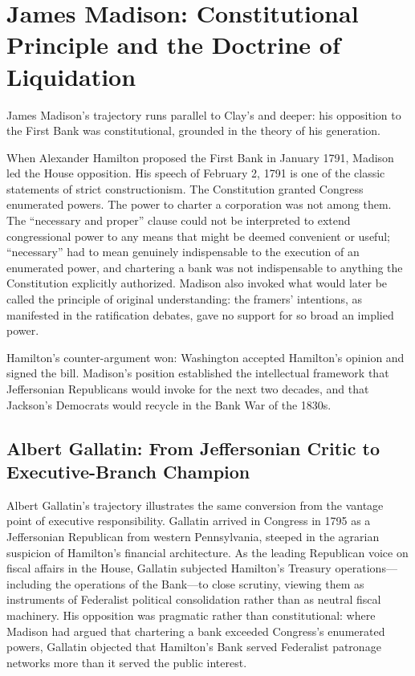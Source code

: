 \documentclass[12pt]{article}
\begin{document}
\section{James Madison: Constitutional Principle and the Doctrine of
         Liquidation}

James Madison's trajectory runs parallel to Clay's and deeper: his
opposition to the First Bank was constitutional, grounded in the theory
of his generation.

When Alexander Hamilton proposed the First Bank in January 1791,
Madison led the House opposition.  His speech of February 2, 1791 is one
of the classic statements of strict constructionism.  The Constitution
granted Congress enumerated powers.  The power to charter a corporation
was not among them.  The ``necessary and proper'' clause could not
be interpreted to extend congressional power to any means that might be
deemed convenient or useful; ``necessary'' had to mean genuinely
indispensable to the execution of an enumerated power, and chartering a
bank was not indispensable to anything the Constitution explicitly
authorized.  Madison also invoked what would later be called
the principle of original understanding: the framers'
intentions, as manifested in the ratification debates, gave no
support for so broad an implied power.

Hamilton's counter-argument won: Washington accepted Hamilton's opinion
and signed the bill.  Madison's position established the intellectual framework that Jeffersonian
Republicans would invoke for the next two decades, and that Jackson's
Democrats would recycle in the Bank War of the 1830s.

\subsection{Albert Gallatin: From Jeffersonian Critic to
             Executive-Branch Champion}

Albert Gallatin's trajectory illustrates the same conversion from the
vantage point of executive responsibility.  Gallatin arrived in Congress
in 1795 as a Jeffersonian Republican from western Pennsylvania, steeped
in the agrarian suspicion of Hamilton's financial architecture.  As the
leading Republican voice on fiscal affairs in the House, Gallatin
subjected Hamilton's Treasury operations---including the operations of
the Bank---to close scrutiny, viewing them as instruments of
Federalist political consolidation rather than as neutral fiscal
machinery.  His opposition was pragmatic rather than constitutional:
where Madison had argued that chartering a bank exceeded Congress's
enumerated powers, Gallatin objected that Hamilton's Bank served
Federalist patronage networks more than it served the public interest.
\end{document}

